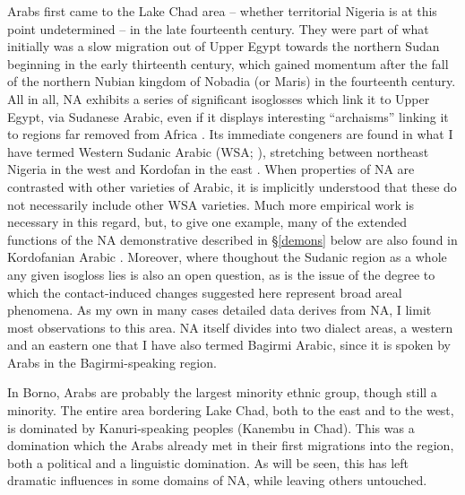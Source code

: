 \documentclass[output=paper]{langsci/langscibook}
\begin{document}
Arabs first came to the Lake Chad area – whether territorial Nigeria is at this point undetermined – in the late fourteenth century. They were part of what initially was a slow migration out of Upper Egypt towards the northern Sudan beginning in the early thirteenth century, which gained momentum after the fall of the northern Nubian kingdom of Nobadia (or Maris) in the fourteenth century. All in all, NA exhibits a series of significant isoglosses which link it to Upper Egypt, via Sudanese Arabic, even if it displays interesting “archaisms” linking it to regions far removed from Africa \citep{Owens2013}. Its immediate congeners are found in what I have termed Western Sudanic Arabic (WSA; \citealt{Owens1994editor,Owens1994author}), stretching between northeast Nigeria in the west and Kordofan in the east \citep{Manfredi2010}. When properties of NA are contrasted with other varieties of Arabic, it is implicitly understood that these do not necessarily include other WSA varieties. Much more empirical work is necessary in this regard, but, to give one example, many of the extended functions of the NA demonstrative described in §\ref{demons} below are also found in Kordofanian Arabic \citep{Manfredi2014demonstratives}. Moreover, where thoughout the Sudanic region as a whole any given isogloss lies is also an open question, as is the issue of the degree to which the contact-induced changes suggested here represent broad areal phenomena. As my own in many cases detailed data derives from NA, I limit most observations to this area. NA itself divides into two dialect areas, a western and an eastern one that I have also termed Bagirmi Arabic, since it is spoken by Arabs in the Bagirmi-speaking region.

In Borno, Arabs are probably the largest minority ethnic group, though still a minority. The entire area bordering Lake Chad, both to the east and to the west, is dominated by Kanuri-speaking peoples (Kanembu in Chad). This was a domination which the Arabs already met in their first migrations into the region, both a political and a linguistic domination. As will be seen, this has left dramatic influences in some domains of NA, while leaving others untouched. 
\end{document}
